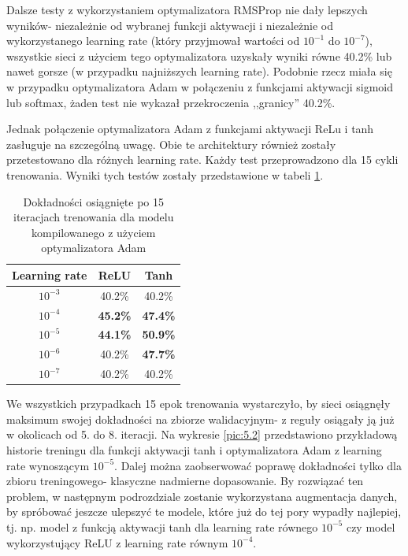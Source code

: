 Dalsze testy z wykorzystaniem optymalizatora RMSProp nie dały lepszych wyników- niezależnie od wybranej funkcji aktywacji i niezależnie od wykorzystanego learning rate (który przyjmował wartości od $10^{-1}$ do $10^{-7}$), wszystkie sieci z użyciem tego optymalizatora uzyskały wyniki równe 40.2\% lub nawet gorsze (w przypadku najniższych learning rate). Podobnie rzecz miała się w przypadku optymalizatora Adam w połączeniu z funkcjami aktywacji sigmoid lub softmax, żaden test nie wykazał przekroczenia ,,granicy'' 40.2\%.

Jednak połączenie optymalizatora Adam z funkcjami aktywacji ReLu i tanh zasługuje na szczególną uwagę. Obie te architektury również zostały przetestowano dla różnych learning rate. Każdy test przeprowadzono dla 15 cykli trenowania. Wyniki tych testów zostały przedstawione w tabeli \ref{tab:5.2}.

\begin{table}[H]
  \centering
  \caption{Dokładności osiągnięte po 15 iteracjach trenowania dla modelu kompilowanego z użyciem optymalizatora Adam}
    \begin{tabular}{ |c|c|c| }
    \hline
    Learning rate & ReLU & Tanh \\
    \hline
    $10^{-3}$ & 40.2\% & 40.2\% \\
    $10^{-4}$ & \textbf{45.2\%} & \textbf{47.4\%} \\
    $10^{-5}$ & \textbf{44.1\%} & \textbf{50.9\%} \\
    $10^{-6}$ & 40.2\% & \textbf{47.7\%} \\
    $10^{-7}$ & 40.2\% & 40.2\% \\
    \hline
    \end{tabular}
  \label{tab:5.2}
\end{table}

We wszystkich przypadkach 15 epok trenowania wystarczyło, by sieci osiągnęły maksimum swojej dokładności na zbiorze walidacyjnym- z reguły osiągały ją już w okolicach od 5. do 8. iteracji. Na wykresie \ref{pic:5.2} przedstawiono przykładową historie treningu dla funkcji aktywacji tanh i optymalizatora Adam z learning rate wynoszącym $10^{-5}$. Dalej można zaobserwować poprawę dokładności tylko dla zbioru treningowego- klasyczne nadmierne dopasowanie. By rozwiązać ten problem, w następnym podrozdziale zostanie wykorzystana augmentacja danych, by spróbować jeszcze ulepszyć te modele, które już do tej pory wypadły najlepiej, tj. np. model z funkcją aktywacji tanh dla learning rate równego $10^{-5}$ czy model wykorzystujący ReLU z learning rate równym $10^{-4}$.

